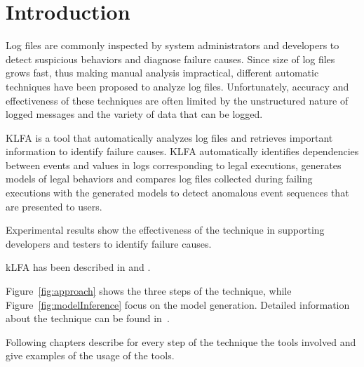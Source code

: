 \chapter{Introduction}

Log files are commonly inspected by system administrators and developers to detect suspicious behaviors and diagnose failure causes. Since size of log files grows fast, thus making manual analysis impractical, different automatic techniques have been proposed to analyze log files. Unfortunately, accuracy and effectiveness of these techniques are often limited by the unstructured nature of logged messages and the variety of data that can be logged.

KLFA is a tool that automatically analyzes log files and retrieves important information to identify failure causes. KLFA automatically identifies dependencies between events and values in logs corresponding to legal executions, generates models of legal behaviors and compares log files collected during failing executions with the generated models to detect anomalous event sequences that are presented to users.

Experimental results show the effectiveness of the technique in supporting developers and testers to identify failure causes.

kLFA has been described in \cite{Cotroneo:LogFileAnalysis:SOQUA:2007} and
\cite{Mariani:ISSRE:2008}.

Figure~\ref{fig:approach} shows the three steps of the technique,
while Figure~\ref{fig:modelInference} focus on the model generation.
Detailed information about the technique can be found
in~\cite{Mariani:ISSRE:2008}.

Following chapters describe for every step of the technique the
tools involved and give examples of the usage of the tools.

